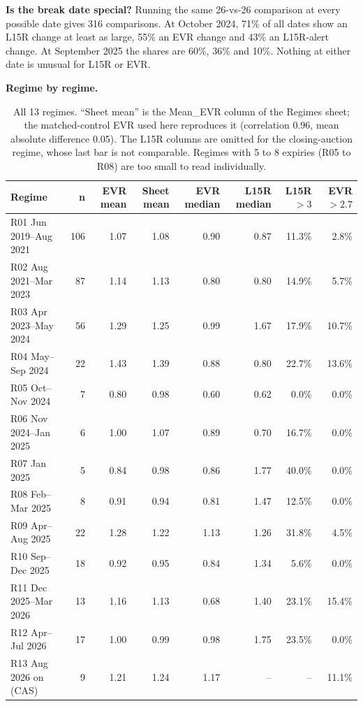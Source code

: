 \documentclass[10pt,a4paper]{article}
\begin{document}
\textbf{Is the break date special?} Running the same 26-vs-26 comparison at every possible date gives 316 comparisons. At October 2024, 71\% of all dates show an L15R change at least as large, 55\% an EVR change and 43\% an L15R-alert change. At September 2025 the shares are 60\%, 36\% and 10\%. Nothing at either date is unusual for L15R or EVR.

\textbf{Regime by regime.}
\begin{table}[h!]\centering\small\setlength{\tabcolsep}{4pt}
\begin{tabular}{lrrrrrrr}
\toprule
Regime & n & EVR mean & Sheet mean & EVR median & L15R median & L15R $>3$ & EVR $>2.7$\\
\midrule
R01 Jun 2019--Aug 2021 & 106 & 1.07 & 1.08 & 0.90 & 0.87 & 11.3\% & 2.8\%\\
R02 Aug 2021--Mar 2023 & 87 & 1.14 & 1.13 & 0.80 & 0.80 & 14.9\% & 5.7\%\\
R03 Apr 2023--May 2024 & 56 & 1.29 & 1.25 & 0.99 & 1.67 & 17.9\% & 10.7\%\\
R04 May--Sep 2024 & 22 & 1.43 & 1.39 & 0.88 & 0.80 & 22.7\% & 13.6\%\\
R05 Oct--Nov 2024 & 7 & 0.80 & 0.98 & 0.60 & 0.62 & 0.0\% & 0.0\%\\
R06 Nov 2024--Jan 2025 & 6 & 1.00 & 1.07 & 0.89 & 0.70 & 16.7\% & 0.0\%\\
R07 Jan 2025 & 5 & 0.84 & 0.98 & 0.86 & 1.77 & 40.0\% & 0.0\%\\
R08 Feb--Mar 2025 & 8 & 0.91 & 0.94 & 0.81 & 1.47 & 12.5\% & 0.0\%\\
R09 Apr--Aug 2025 & 22 & 1.28 & 1.22 & 1.13 & 1.26 & 31.8\% & 4.5\%\\
R10 Sep--Dec 2025 & 18 & 0.92 & 0.95 & 0.84 & 1.34 & 5.6\% & 0.0\%\\
R11 Dec 2025--Mar 2026 & 13 & 1.16 & 1.13 & 0.68 & 1.40 & 23.1\% & 15.4\%\\
R12 Apr--Jul 2026 & 17 & 1.00 & 0.99 & 0.98 & 1.75 & 23.5\% & 0.0\%\\
R13 Aug 2026 on (CAS) & 9 & 1.21 & 1.24 & 1.17 & -- & -- & 11.1\%\\
\bottomrule
\end{tabular}
\caption{All 13 regimes. ``Sheet mean'' is the Mean\_EVR column of the Regimes sheet; the matched-control EVR used here reproduces it (correlation 0.96, mean absolute difference 0.05). The L15R columns are omitted for the closing-auction regime, whose last bar is not comparable. Regimes with 5 to 8 expiries (R05 to R08) are too small to read individually.}
\end{table}
\end{document}
